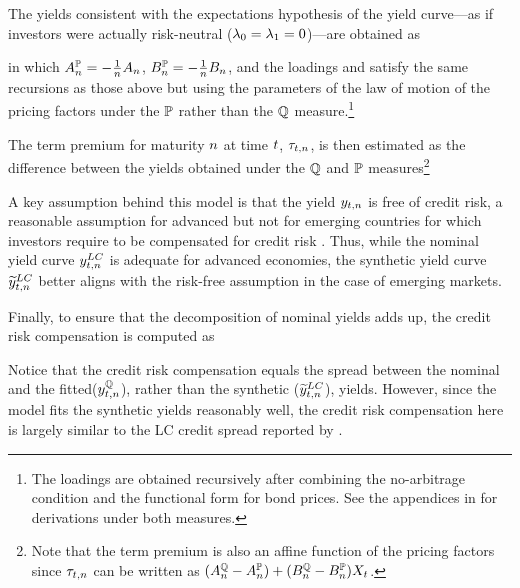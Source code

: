 {The yields consistent with the expectations hypothesis of the yield curve---as if investors were actually risk-neutral (\(\lambda_{0} = \lambda_{1} = 0\))---are obtained as
	
\noindent in which \(A_{n}^{\mathbb{P}} = - \frac{1}{n} A_{n}\), \(B_{n}^{\mathbb{P}} = - \frac{1}{n} B_{n}\), and the loadings  \!and  \!satisfy the same recursions as those above but using the parameters of the law of motion of the pricing factors under the \(\mathbb{P}\) rather than the \(\mathbb{Q}\) measure.\footnote{ The loadings are obtained recursively after combining the no-arbitrage condition and the functional form for bond prices. See the appendices in \cite{Lloyd:2020} for derivations under both measures.} %

The term premium for maturity \(n\) at time \(t\), \(\tau_{t,n}\), is then estimated as the difference between the yields obtained under the \(\mathbb{Q}\) and \(\mathbb{P}\) measures\footnote{ Note that the term premium is also an affine function of the pricing factors since \(\tau_{t,n}\) can be written as \((A_{n}^{\mathbb{Q}} - A_{n}^{\mathbb{P}}) + (B_{n}^{\mathbb{Q}}  - B_{n}^{\mathbb{P}}) X_{t} \).}
	
A key assumption behind this model is that the yield \(y_{t,n}\) is free of credit risk, a reasonable assumption for advanced but not for emerging countries for which investors require to be compensated for credit risk \citep{DuSchreger:2016JoF,DuSchreger:2017WP}. 
Thus, %
while the nominal yield curve \(y_{t,n} ^{LC}\) is adequate for advanced economies, %
the synthetic yield curve \(\widetilde{y}_{t,n} ^{LC}\) better aligns with the risk-free assumption %
in the case of emerging markets.

Finally, to ensure that the decomposition of nominal yields adds up, %
the credit risk compensation is computed as
	
\noindent Notice that the credit risk compensation equals the spread between the nominal %
and the fitted(\(y_{t,n}^{\mathbb{Q}}\)), rather than the synthetic (\(\widetilde{y}_{t,n} ^{LC}\)), yields. However, since the model fits the synthetic yields reasonably well, the credit risk compensation here is largely similar to the LC credit spread reported by \cite{DuSchreger:2016JoF}.

}

